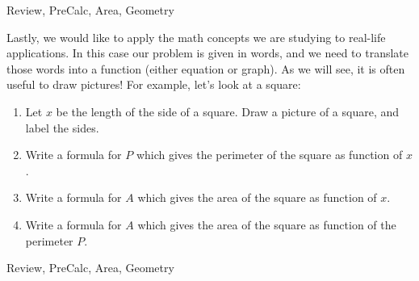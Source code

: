 \begin{tagblock}{Review, PreCalc, Area, Geometry}
\begin{question}

Lastly, we would like to apply the math concepts we are studying to real-life applications.  In this case our problem is given in words, and we need to translate those words into a function (either equation or graph).  As we will see, it is often useful to draw pictures!  For example, let's look at a square:
\begin{enumerate}
\item Let $x$ be the length of the side of a square.  Draw a picture of a square, and label the sides.
\item Write a formula for $P$ which gives the perimeter of the square as function of $x$.  
\item Write a formula for $A$ which gives the area of the square as function of $x$. 
\item Write a formula for  $A$ which gives the area of the square as function of the perimeter $P$.  
\end{enumerate}



	
 

\begin{tags}
	    Review, PreCalc, Area, Geometry
\end{tags}
	
\begin{diary}
	    
\end{diary}
	
\begin{solution}
		
\end{solution}
	
\end{question}

\end{tagblock}

